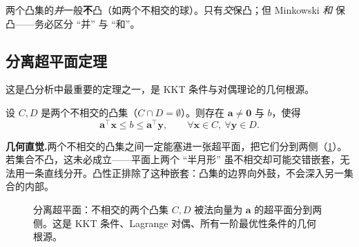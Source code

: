 \begin{pitfall}
两个凸集的\emph{并}一般\textbf{不}凸（如两个不相交的球）。只有\emph{交}保凸；但 Minkowski \emph{和} 保凸——务必区分 “并” 与 “和”。
\end{pitfall}

\subsection{分离超平面定理}
\label{subsec:cvx-sep-thm}

这是凸分析中最重要的定理之一，是 KKT 条件与对偶理论的几何根源。

\begin{theorem}[分离超平面定理]\label{thm:separation}
设 $C,D$ 是两个不相交的凸集（$C\cap D=\emptyset$）。则存在 $\mathbf a\neq\mathbf 0$ 与 $b$，使得
\begin{equation}
  \mathbf a^\top\mathbf x\le b\le\mathbf a^\top\mathbf y,\qquad\forall\mathbf x\in C,\ \forall\mathbf y\in D.
  \label{eq:separation}
\end{equation}
\end{theorem}

\noindent\textbf{几何直觉.}\;两个不相交的凸集之间一定能塞进一张超平面，把它们分到两侧（\cref{fig:cvx-sep}）。若集合不凸，这未必成立——平面上两个 “半月形” 虽不相交却可能交错嵌套，无法用一条直线分开。凸性正排除了这种嵌套：凸集的边界向外鼓，不会深入另一集合的内部。

\begin{figure}[ht]
\centering
{}
\caption{分离超平面：不相交的两个凸集 $C,D$ 被法向量为 $\mathbf a$ 的超平面分到两侧。这是 KKT 条件、Lagrange 对偶、所有一阶最优性条件的几何根源。}
\label{fig:cvx-sep}
\end{figure}

